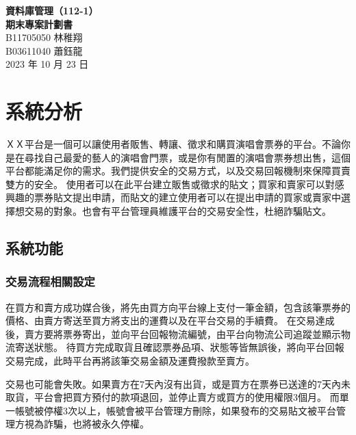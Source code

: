 \documentclass[12pt,a4paper]{article}
\begin{document}
\title{}
\author{}
\date{}

\begin{center}
\textbf{\Large 資料庫管理（112-1） \\[5pt]
期末專案計劃書} \\[10pt]
B11705050 林稚翔 \\
B03611040 蕭鈺龍 \\
2023 年 10 月 23 日
\end{center}





\section{系統分析}

ＸＸ平台是一個可以讓使用者販售、轉讓、徵求和購買演唱會票券的平台。不論你是在尋找自己最愛的藝人的演唱會門票，或是你有閒置的演唱會票券想出售，這個平台都能滿足你的需求。我們提供安全的交易方式，以及交易回報機制來保障買賣雙方的安全。
使用者可以在此平台建立販售或徵求的貼文；買家和賣家可以對感興趣的票券貼文提出申請，而貼文的建立使用者可以在提出申請的買家或賣家中選擇想交易的對象。也會有平台管理員維護平台的交易安全性，杜絕詐騙貼文。

\subsection{系統功能}    

\subsubsection{交易流程相關設定}

在買方和賣方成功媒合後，將先由買方向平台線上支付一筆金額，包含該筆票券的價格、由賣方寄送至買方將支出的運費以及在平台交易的手續費。
在交易達成後，賣方要將票券寄出，並向平台回報物流編號，由平台向物流公司追蹤並顯示物流寄送狀態。
待買方完成取貨且確認票券品項、狀態等皆無誤後，將向平台回報交易完成，此時平台再將該筆交易金額及運費撥款至賣方。

交易也可能會失敗。如果賣方在7天內沒有出貨，或是買方在票券已送達的7天內未取貨，平台會把買方預付的款項退回，並停止賣方或買方的使用權限3個月。
而單一帳號被停權3次以上，帳號會被平台管理方刪除，如果發布的交易貼文被平台管理方視為詐騙，也將被永久停權。
\end{document}
